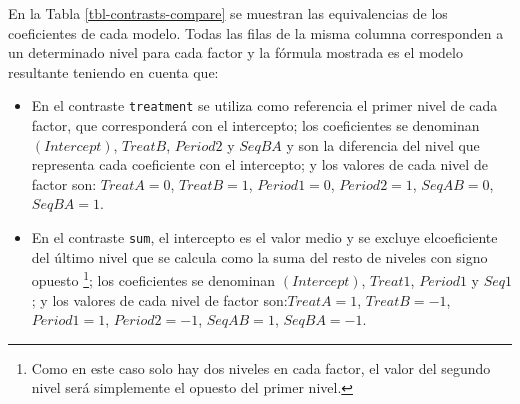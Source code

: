 \documentclass[
  12pt,
  a4paper,
  extrafontsizes,
  onecolumn,
  openright,
  table]{memoir}
\begin{document}
En la Tabla \ref{tbl-contrasts-compare} se muestran las equivalencias de
los coeficientes de cada modelo. Todas las filas de la misma columna
corresponden a un determinado nivel para cada factor y la fórmula
mostrada es el modelo resultante teniendo en cuenta que:

\begin{itemize}
\item
  En el contraste \texttt{treatment} se utiliza como referencia el
  primer nivel de cada factor, que corresponderá con el intercepto; los
  coeficientes se denominan \((Intercept)\), \(TreatB\), \(Period2\) y
  \(SeqBA\) y son la diferencia del nivel que representa cada
  coeficiente con el intercepto; y los valores de cada nivel de factor
  son: \(TreatA = 0\), \(TreatB = 1\), \(Period1 = 0\), \(Period2 = 1\),
  \(SeqAB = 0\), \(SeqBA = 1\).
\item
  En el contraste \texttt{sum}, el intercepto es el valor medio y se
  excluye elcoeficiente del último nivel que se calcula como la suma del
  resto de niveles con signo opuesto \footnote{Como en este caso solo
    hay dos niveles en cada factor, el valor del segundo nivel será
    simplemente el opuesto del primer nivel.}; los coeficientes se
  denominan \((Intercept)\), \(Treat1\), \(Period1\) y \(Seq1\); y los
  valores de cada nivel de factor son:\(TreatA = 1\), \(TreatB = -1\),
  \(Period1 = 1\), \(Period2 = -1\), \(SeqAB = 1\), \(SeqBA = -1\).
\end{itemize}
\end{document}
